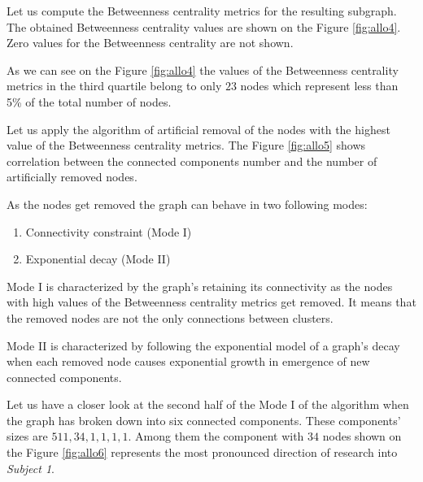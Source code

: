 \documentclass[12pt]{report}
\theoremstyle{definition}
\begin{document}
Let us compute the Betweenness centrality metrics for the resulting subgraph. 
The obtained Betweenness centrality values are shown on the Figure \ref{fig:allo4}. 
Zero values for the Betweenness centrality are not shown.


As we can see on the Figure \ref{fig:allo4} the values of the Betweenness centrality metrics in the third quartile belong to only $23$ nodes which represent less than 5\% of the total number of nodes. 

Let us apply the algorithm of artificial removal of the nodes with the highest value of the Betweenness centrality metrics. The Figure \ref{fig:allo5}  shows correlation between the connected components number and the number of artificially removed nodes.


As the nodes get removed the graph can behave in two following modes: 
\begin{enumerate}
	\item Connectivity constraint (Mode I)
	\item Exponential decay (Mode II)
\end{enumerate}

Mode I is characterized by the graph’s retaining its connectivity as the nodes with high values of the Betweenness centrality metrics get removed.  It means that the removed nodes are not the only connections between clusters.

Mode II is characterized by following the exponential model of a graph’s decay when each removed node causes exponential growth in emergence of new connected components.

Let us have a closer look at the second half of the Mode I of the algorithm when the graph has broken down into six connected components. These components’ sizes are $511, 34, 1, 1, 1, 1$. Among them the component with $34$ nodes shown on the Figure \ref{fig:allo6} represents the most pronounced direction of research into \textit{Subject 1}.
\end{document}
